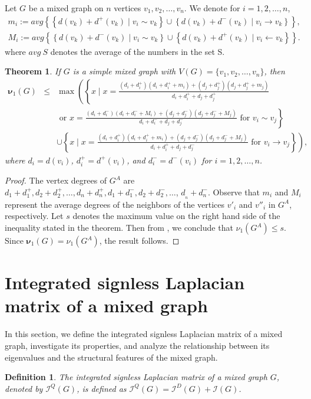 \documentclass[12pt]{article}
\numberwithin{equation}{section}
\newtheorem{thm}{Theorem}[section]
\newtheorem{defn}{Definition}[section]
\begin{document}
	Let $G$ be a mixed graph on $n$ vertices $v_1,v_2,\ldots,v_n$. We denote for $i=1,2,\ldots,n$,
	\begin{eqnarray*}
		m_i:=avg\left\{\left\{d(v_k)+d^+(v_k)\mid v_i\sim v_k\right\}\cup\left\{d(v_k)+d^-(v_k)\mid v_i\rightarrow v_k\right\}\right\},\\
		M_i:=avg\left\{\left\{d(v_k)+d^-(v_k)\mid v_i\sim v_k\right\}\cup\left\{d(v_k)+d^+(v_k)\mid v_i\leftarrow v_k\right\}\right\}.
	\end{eqnarray*}
where $avg~S$ denotes the average of the numbers in the set S. 
	
	\begin{thm}
		If $G$ is a  simple mixed graph with $V(G)=\{v_1,v_2,\ldots,v_n\}$, then
		\begin{eqnarray*}
			\bm{\nu}_1(G)&\leq& \max\left(\left\{x\mid x=\frac{(d_i+d_i^+)(d_i+d_i^++m_i)+(d_j+d_j^+)(d_j+d_j^++m_j)}{d_i+d_i^++d_j+d_j^+}\right.\right. \\ & & \left.\text{~or~} x=\frac{(d_i+d_i^-)(d_i+d_i^-+M_i)+(d_j+d_j^-)(d_j+d_j^-+M_j)}{d_i+d_i^-+d_j+d_j^-} \text{~for~}v_i\sim v_j\right\}\\
			& & \cup \left.\left\{x\mid x=\frac{(d_i+d_i^+)(d_i+d_i^++m_i)+(d_j+d_j^-)(d_j+d_j^-+M_j)}{d_i+d_i^++d_j+d_j^-} \text{~for~}v_i\rightarrow v_j\right\}\right),
		\end{eqnarray*}	
		where $d_i=d(v_i)$, $d^+_i=d^+(v_i)$, and $d^-_i=d^-(v_i)$ for $i=1,2,\ldots,n$.
	\end{thm}
	\begin{proof}
		The vertex degrees of $G^A$ are $d_{1}+d_{1}^+, d_{2}+d_{2}^+, \ldots, d_{n}+d_{n}^+, d_{1}+d_{1}^-, d_{2}+d_{2}^-, \dots$, $d_{_n}+d_{n}^-$. Observe that $m_i$ and $M_i$ represent the average degrees of the neighbors of the vertices $v'_i$ and $v''_i$ in $G^A$, respectively. Let $s$ denotes the maximum value on the right hand side of the inequality stated in the theorem. Then from \cite[Theorem~7.3.5]{cvetkovic},
%		
		we conclude that
		$\nu_1(G^A)\leq s$. Since $\bm{\nu}_1(G)=\nu_1(G^A)$, the result follows.
	\end{proof}
	
	\section{Integrated signless Laplacian matrix of a mixed graph}\label{S5}
In this section, we define the integrated signless Laplacian matrix of a mixed graph, investigate its properties, and analyze the relationship between its eigenvalues and the structural features of the mixed graph.
	\begin{defn}\normalfont
		The \textit{integrated signless Laplacian matrix} of a mixed graph $G$, denoted by $\mathcal{I}^Q(G)$, is defined as $\mathcal{I}^Q(G)=\mathcal{I}^D(G)+\mathcal{I}(G)$.
	\end{defn}
	
\end{document}
